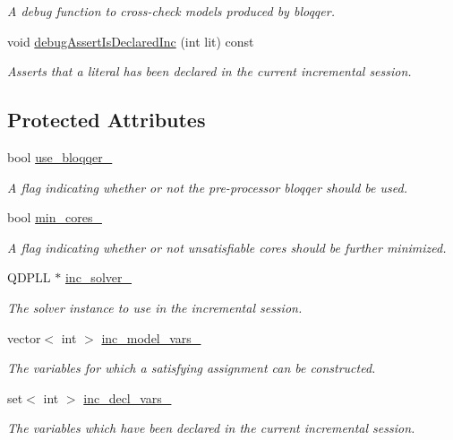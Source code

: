 \begin{DoxyCompactItemize}
\begin{DoxyCompactList}\small\item\em A debug function to cross-\/check models produced by bloqqer. \end{DoxyCompactList}\item 
void \hyperlink{classDepQBFApi_a6731d3b5e3c5d89f2b3d9e2056ca93f6}{debug\-Assert\-Is\-Declared\-Inc} (int lit) const 
\begin{DoxyCompactList}\small\item\em Asserts that a literal has been declared in the current incremental session. \end{DoxyCompactList}\end{DoxyCompactItemize}
\subsection*{Protected Attributes}
\begin{DoxyCompactItemize}
\item 
bool \hyperlink{classDepQBFApi_a04798225c77a19a1d2f415e50b93cfb1}{use\-\_\-bloqqer\-\_\-}
\begin{DoxyCompactList}\small\item\em A flag indicating whether or not the pre-\/processor bloqqer should be used. \end{DoxyCompactList}\item 
bool \hyperlink{classDepQBFApi_aeba411424d6185767325936d2ccf11de}{min\-\_\-cores\-\_\-}
\begin{DoxyCompactList}\small\item\em A flag indicating whether or not unsatisfiable cores should be further minimized. \end{DoxyCompactList}\item 
Q\-D\-P\-L\-L $\ast$ \hyperlink{classDepQBFApi_a22f9645648890b1997e702743fc2e8fe}{inc\-\_\-solver\-\_\-}
\begin{DoxyCompactList}\small\item\em The solver instance to use in the incremental session. \end{DoxyCompactList}\item 
vector$<$ int $>$ \hyperlink{classDepQBFApi_a45305a0f7bb106f43eb7d12554e71564}{inc\-\_\-model\-\_\-vars\-\_\-}
\begin{DoxyCompactList}\small\item\em The variables for which a satisfying assignment can be constructed. \end{DoxyCompactList}\item 
set$<$ int $>$ \hyperlink{classDepQBFApi_a28c913cc99ac6671a2f86dafe1c9f55a}{inc\-\_\-decl\-\_\-vars\-\_\-}
\begin{DoxyCompactList}\small\item\em The variables which have been declared in the current incremental session. \end{DoxyCompactList}\end{DoxyCompactItemize}
